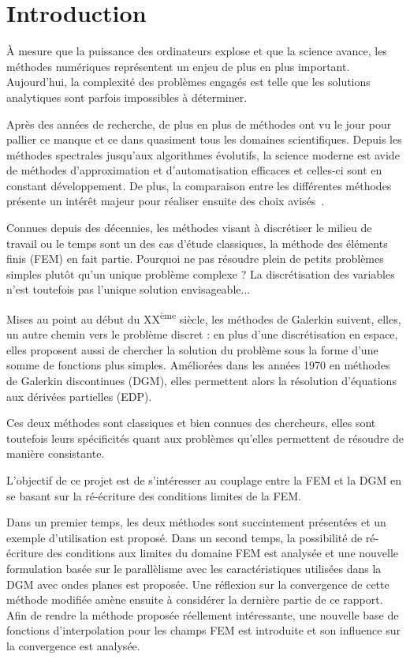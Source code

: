 \section*{Introduction}

À mesure que la puissance des ordinateurs explose et que la science avance, les méthodes numériques représentent un
enjeu de plus en plus important. Aujourd'hui, la complexité des problèmes engagés est telle que les solutions
analytiques sont parfois impossibles à déterminer.

Après des années de recherche, de plus en plus de méthodes ont vu le jour pour pallier ce manque et ce dans quasiment
tous les domaines scientifiques. Depuis les méthodes spectrales jusqu'aux algorithmes évolutifs, la science moderne est
avide de méthodes d'approximation et d'automatisation efficaces et celles-ci sont en constant développement. De plus,
la comparaison entre les différentes méthodes présente un intérêt majeur pour réaliser ensuite des choix
avisés~\cite{Gabard11}.

Connues depuis des décennies, les méthodes visant à discrétiser le milieu de travail ou le temps sont un des cas
d'étude classiques, la méthode des éléments finis (FEM) en fait partie. Pourquoi ne pas résoudre plein de petits problèmes
simples plutôt qu'un unique problème complexe ? La discrétisation des variables n'est toutefois pas l'unique solution
envisageable...

Mises au point au début du XX\textsuperscript{ème} siècle, les méthodes de Galerkin suivent, elles, un autre chemin vers le
problème discret : en plus d'une discrétisation en espace, elles proposent aussi de chercher la solution du problème
sous la forme d'une somme de fonctions plus simples. Améliorées dans les années 1970 en méthodes de Galerkin
discontinues (DGM), elles permettent alors la résolution d'équations aux dérivées partielles (EDP).

Ces deux méthodes sont classiques et bien connues des chercheurs, elles sont toutefois leurs spécificités quant aux
problèmes qu'elles permettent de résoudre de manière consistante.

\bigskip

L'objectif de ce projet est de s'intéresser au couplage entre la FEM et la DGM en se basant sur la ré-écriture des
conditions limites de la FEM.

Dans un premier temps, les deux méthodes sont succintement présentées et un exemple d'utilisation est proposé.
Dans un second temps, la possibilité de ré-écriture des conditions aux limites du domaine FEM est analysée et une
nouvelle formulation basée sur le parallèlisme avec les caractéristiques utilisées dans la DGM avec ondes planes est
proposée. Une réflexion sur la convergence de cette méthode modifiée amène ensuite à considérer la dernière partie de ce
rapport. Afin de rendre la méthode proposée réellement intéressante, une nouvelle base de fonctions d'interpolation pour
les champs FEM est introduite et son influence sur la convergence est analysée.



